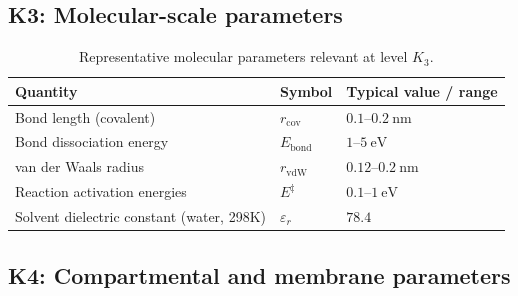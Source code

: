 
\subsection*{K3: Molecular-scale parameters}

\begin{table}[htbp]
  \centering
  \caption{Representative molecular parameters relevant at level \(K_3\).}
  \label{tab:k3-molecular-parameters}
  \begin{tabular}{@{}L{0.44\textwidth}L{0.16\textwidth}L{0.23\textwidth}@{}}
    \hline
    Quantity & Symbol & Typical value / range \\
    \hline
    Bond length (covalent) & \(r_\mathrm{cov}\)
        & \(0.1\text{–}0.2~\mathrm{nm}\) \\
    Bond dissociation energy & \(E_\mathrm{bond}\)
        & \(1\text{–}5~\mathrm{eV}\) \\
    van der Waals radius & \(r_\mathrm{vdW}\)
        & \(0.12\text{–}0.2~\mathrm{nm}\) \\
    Reaction activation energies & \(E^\ddagger\)
        & \(0.1\text{–}1~\mathrm{eV}\) \\
    Solvent dielectric constant (water, 298K)
        & \(\varepsilon_r\)
        & \(78.4\) \\
    \hline
  \end{tabular}
\end{table}


\subsection*{K4: Compartmental and membrane parameters}

